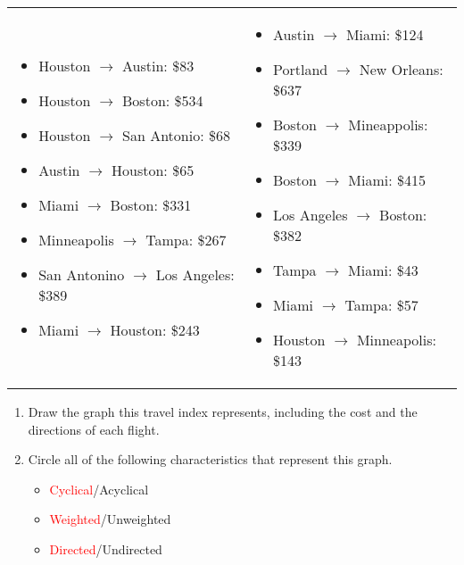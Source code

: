\documentclass[11pt,addpoints]{exam}
\begin{document}
\begin{questions}
\begin{table}[H]
  \begin{tabular}{p{}p{}}
\begin{itemize}
  \item Houston $\to$ Austin: \$83
  \item Houston $\to$ Boston: \$534
  \item Houston $\to$ San Antonio: \$68
  \item Austin $\to$ Houston: \$65
  \item Miami $\to$ Boston: \$331
  \item Minneapolis $\to$ Tampa: \$267
  \item San Antonino $\to$ Los Angeles: \$389
  \item Miami $\to$ Houston: \$243
\end{itemize} &
\begin{itemize}
  \item Austin $\to$ Miami: \$124
  \item Portland $\to$ New Orleans: \$637
  \item Boston $\to$ Mineappolis: \$339
  \item Boston $\to$ Miami: \$415
  \item Los Angeles $\to$ Boston: \$382 
  \item Tampa $\to$ Miami: \$43
  \item Miami $\to$ Tampa: \$57
  \item Houston $\to$ Minneapolis: \$143
\end{itemize}
\end{tabular}
\end{table}

\begin{enumerate}[label=(\Alph*)]
  \item Draw the graph this travel index represents, including the cost and the directions of each flight.


  \item Circle all of the following characteristics that represent this graph.

  \begin{itemize}
    \item \textcolor{red}{Cyclical}/Acyclical
    \item \textcolor{red}{Weighted}/Unweighted
    \item \textcolor{red}{Directed}/Undirected \\
  \end{itemize}


\end{enumerate}
\end{questions}
\end{document}
